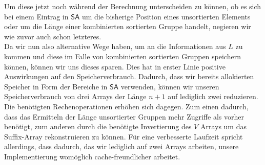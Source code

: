 Um diese jetzt noch während der Berechnung unterscheiden zu können, ob es sich bei einem Eintrag in $\mathsf{SA}$ um die bisherige Position eines unsortierten Elements oder um die Länge einer kombinierten sortierten Gruppe handelt, negieren wir wie zuvor auch schon letzteres.\\
Da wir nun also alternative Wege haben, um an die Informationen aus $L$ zu kommen und diese im Falle von kombinierten sortierten Gruppen speichern können, können wir uns dieses sparen. Dies hat in erster Linie positive Auswirkungen auf den Speicherverbrauch. Dadurch, dass wir bereits allokierten Speicher in Form der Bereiche in $\mathsf{SA}$ verwenden, können wir unseren Speicherverbrauch von drei Arrays der Länge $n+1$ auf lediglich zwei reduzieren. Die benötigten Rechenoperationen erhöhen sich dagegen. Zum einen dadurch, dass das Ermitteln der Länge unsortierter Gruppen mehr Zugriffe als vorher benötigt, zum anderen durch die benötigte Invertierung des $V$ Arrays um das Suffix-Array rekonstruieren zu können. Für eine verbesserte Laufzeit spricht allerdings, dass dadurch, das wir lediglich auf zwei Arrays arbeiten, unsere Implementierung womöglich cache-freundlicher arbeitet.
